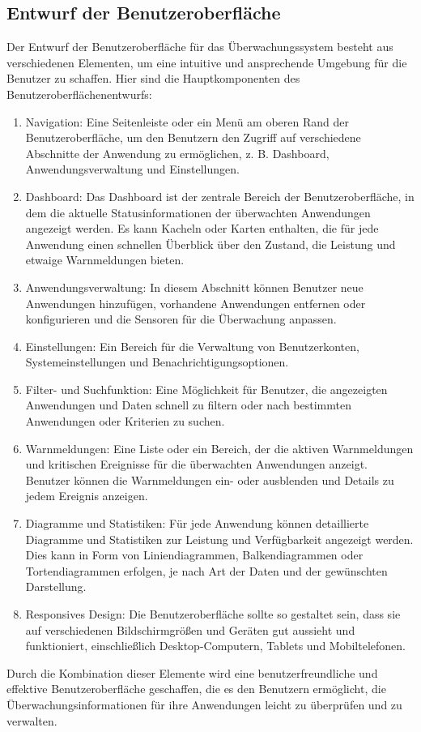 \begin{flushleft}
\subsection{Entwurf der Benutzeroberfläche}
Der Entwurf der Benutzeroberfläche für das Überwachungssystem besteht aus verschiedenen Elementen, um eine intuitive und ansprechende Umgebung für die Benutzer zu schaffen. Hier sind die Hauptkomponenten des Benutzeroberflächenentwurfs:
\begin{enumerate}
\item Navigation: Eine Seitenleiste oder ein Menü am oberen Rand der Benutzeroberfläche, um den Benutzern den Zugriff auf verschiedene Abschnitte der Anwendung zu ermöglichen, z. B. Dashboard, Anwendungsverwaltung und Einstellungen.
\item Dashboard: Das Dashboard ist der zentrale Bereich der Benutzeroberfläche, in dem die aktuelle Statusinformationen der überwachten Anwendungen angezeigt werden. Es kann Kacheln oder Karten enthalten, die für jede Anwendung einen schnellen Überblick über den Zustand, die Leistung und etwaige Warnmeldungen bieten.
\item Anwendungsverwaltung: In diesem Abschnitt können Benutzer neue Anwendungen hinzufügen, vorhandene Anwendungen entfernen oder konfigurieren und die Sensoren für die Überwachung anpassen.
\item Einstellungen: Ein Bereich für die Verwaltung von Benutzerkonten, Systemeinstellungen und Benachrichtigungsoptionen.
\item Filter- und Suchfunktion: Eine Möglichkeit für Benutzer, die angezeigten Anwendungen und Daten schnell zu filtern oder nach bestimmten Anwendungen oder Kriterien zu suchen.
\item Warnmeldungen: Eine Liste oder ein Bereich, der die aktiven Warnmeldungen und kritischen Ereignisse für die überwachten Anwendungen anzeigt. Benutzer können die Warnmeldungen ein- oder ausblenden und Details zu jedem Ereignis anzeigen.
\item Diagramme und Statistiken: Für jede Anwendung können detaillierte Diagramme und Statistiken zur Leistung und Verfügbarkeit angezeigt werden. Dies kann in Form von Liniendiagrammen, Balkendiagrammen oder Tortendiagrammen erfolgen, je nach Art der Daten und der gewünschten Darstellung.
\item Responsives Design: Die Benutzeroberfläche sollte so gestaltet sein, dass sie auf verschiedenen Bildschirmgrößen und Geräten gut aussieht und funktioniert, einschließlich Desktop-Computern, Tablets und Mobiltelefonen.
\end{enumerate}
Durch die Kombination dieser Elemente wird eine benutzerfreundliche und effektive Benutzeroberfläche geschaffen, die es den Benutzern ermöglicht, die Überwachungsinformationen für ihre Anwendungen leicht zu überprüfen und zu verwalten.


\end{flushleft}
